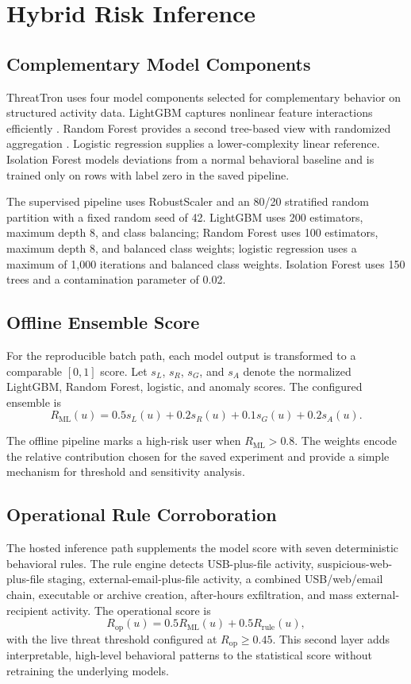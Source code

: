 \section{Hybrid Risk Inference}
\subsection{Complementary Model Components}
ThreatTron uses four model components selected for complementary behavior on structured activity data. LightGBM captures nonlinear feature interactions efficiently \cite{ke2017}. Random Forest provides a second tree-based view with randomized aggregation \cite{breiman2001}. Logistic regression supplies a lower-complexity linear reference. Isolation Forest models deviations from a normal behavioral baseline and is trained only on rows with label zero in the saved pipeline.

The supervised pipeline uses RobustScaler and an 80/20 stratified random partition with a fixed random seed of 42. LightGBM uses 200 estimators, maximum depth 8, and class balancing; Random Forest uses 100 estimators, maximum depth 8, and balanced class weights; logistic regression uses a maximum of 1,000 iterations and balanced class weights. Isolation Forest uses 150 trees and a contamination parameter of 0.02.

\subsection{Offline Ensemble Score}
For the reproducible batch path, each model output is transformed to a comparable $[0,1]$ score. Let $s_L$, $s_R$, $s_G$, and $s_A$ denote the normalized LightGBM, Random Forest, logistic, and anomaly scores. The configured ensemble is
\begin{equation}
R_{\mathrm{ML}}(u)=0.5s_L(u)+0.2s_R(u)+0.1s_G(u)+0.2s_A(u).
\end{equation}

The offline pipeline marks a high-risk user when $R_{\mathrm{ML}}>0.8$. The weights encode the relative contribution chosen for the saved experiment and provide a simple mechanism for threshold and sensitivity analysis.

\subsection{Operational Rule Corroboration}
The hosted inference path supplements the model score with seven deterministic behavioral rules. The rule engine detects USB-plus-file activity, suspicious-web-plus-file staging, external-email-plus-file activity, a combined USB/web/email chain, executable or archive creation, after-hours exfiltration, and mass external-recipient activity. The operational score is
\begin{equation}
R_{\mathrm{op}}(u)=0.5R_{\mathrm{ML}}(u)+0.5R_{\mathrm{rule}}(u),
\end{equation}
with the live threat threshold configured at $R_{\mathrm{op}}\geq0.45$. This second layer adds interpretable, high-level behavioral patterns to the statistical score without retraining the underlying models.

